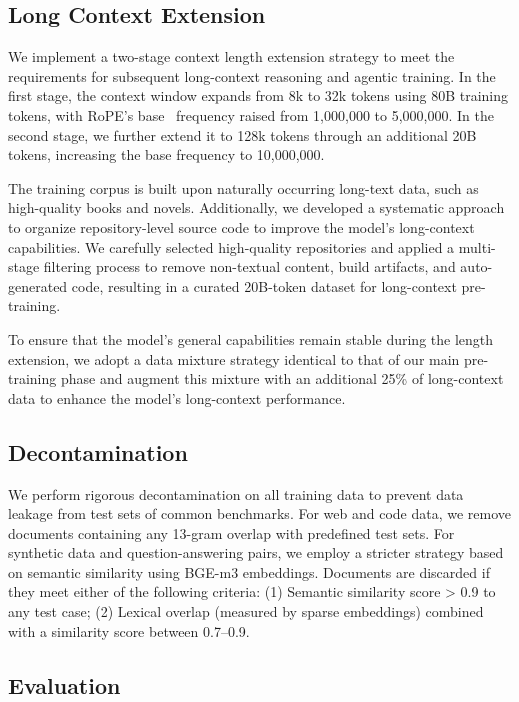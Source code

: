 \documentclass{article}
\begin{document}
\subsection{Long Context Extension}
We implement a two-stage context length extension strategy to meet the requirements for subsequent long-context reasoning and agentic training. In the first stage, the context window expands from 8k to 32k tokens using 80B training tokens, with RoPE's base~\citep{su2024roformer} frequency raised from 1,000,000 to 5,000,000. In the second stage, we further extend it to 128k tokens through an additional 20B tokens, increasing the base frequency to 10,000,000.



The training corpus is built upon naturally occurring long-text data, such as high-quality books and novels. 
Additionally, we developed a systematic approach to organize repository-level source code to improve the model's long-context capabilities. 
We carefully selected high-quality repositories and applied a multi-stage filtering process to remove non-textual content, build artifacts, and auto-generated code, resulting in a curated 20B-token dataset for long-context pre-training.

To ensure that the model's general capabilities remain stable during the length extension, we adopt a data mixture strategy identical to that of our main pre-training phase and augment this mixture with an additional 25\% of long-context data to enhance the model's long-context performance.


\subsection{Decontamination}

We perform rigorous decontamination on all training data to prevent data leakage from test sets of common benchmarks. For web and code data, we remove documents containing any 13-gram overlap with predefined test sets. For synthetic data and question-answering pairs, we employ a stricter strategy based on semantic similarity using BGE-m3 \citep{bge-m3} embeddings. Documents are discarded if they meet either of the following criteria: (1) Semantic similarity score > 0.9 to any test case; (2) Lexical overlap (measured by sparse embeddings) combined with a similarity score between 0.7–0.9.


\subsection{Evaluation}

\end{document}
